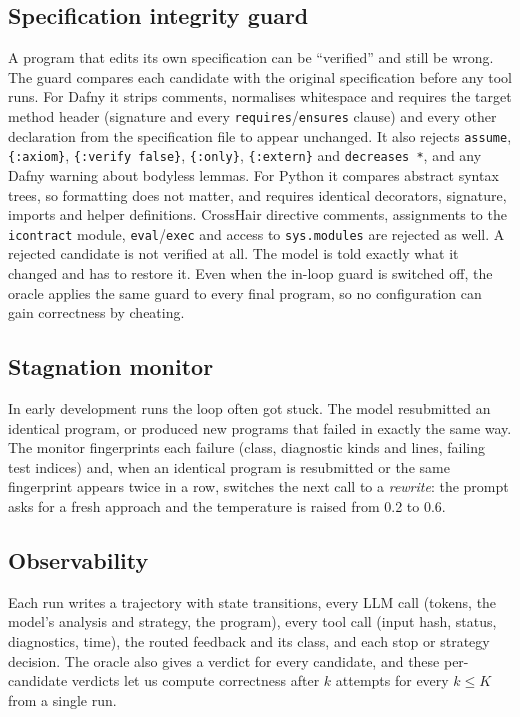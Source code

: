 \subsection{Specification integrity guard}
\label{sec:guard}
A program that edits its own specification can be ``verified'' and still be wrong. The guard compares each candidate with the original specification before any tool runs. For Dafny it strips comments, normalises whitespace and requires the target method header (signature and every \texttt{requires}/\texttt{ensures} clause) and every other declaration from the specification file to appear unchanged. It also rejects \texttt{assume}, \texttt{\{:axiom\}}, \texttt{\{:verify false\}}, \texttt{\{:only\}}, \texttt{\{:extern\}} and \texttt{decreases *}, and any Dafny warning about bodyless lemmas. For Python it compares abstract syntax trees, so formatting does not matter, and requires identical decorators, signature, imports and helper definitions. CrossHair directive comments, assignments to the \texttt{icontract} module, \texttt{eval}/\texttt{exec} and access to \texttt{sys.modules} are rejected as well. A rejected candidate is not verified at all. The model is told exactly what it changed and has to restore it. Even when the in-loop guard is switched off, the oracle applies the same guard to every final program, so no configuration can gain correctness by cheating.

\subsection{Stagnation monitor}
In early development runs the loop often got stuck. The model resubmitted an identical program, or produced new programs that failed in exactly the same way. The monitor fingerprints each failure (class, diagnostic kinds and lines, failing test indices) and, when an identical program is resubmitted or the same fingerprint appears twice in a row, switches the next call to a \emph{rewrite}: the prompt asks for a fresh approach and the temperature is raised from 0.2 to 0.6.

\subsection{Observability}
Each run writes a trajectory with state transitions, every LLM call (tokens, the model's analysis and strategy, the program), every tool call (input hash, status, diagnostics, time), the routed feedback and its class, and each stop or strategy decision. The oracle also gives a verdict for every candidate, and these per-candidate verdicts let us compute correctness after $k$ attempts for every $k \le K$ from a single run.
